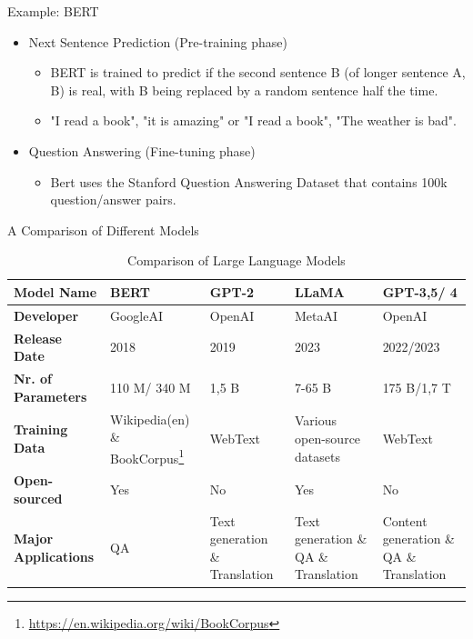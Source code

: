 \documentclass[t]{beamer}
\begin{document}
\begin{frame}{Example: BERT \cite{Devlin18}}
  \vspace{1cm}
  \begin{itemize}
    \item Next Sentence Prediction (Pre-training phase)
    \begin{itemize}
      \item BERT is trained to predict if the second sentence B (of longer sentence A, B) is real, with B being replaced by a random sentence half the time.
      \item "I read a book", "it is amazing" or "I read a book", "The weather is bad".
    \end{itemize}
    \vspace{1cm}
    \item Question Answering (Fine-tuning phase)
    \begin{itemize}
      \item Bert uses the Stanford Question Answering Dataset that contains 100k question/answer pairs.
    \end{itemize}
  \end{itemize}
\end{frame}

\begin{frame}{A Comparison of Different Models}
  \begin{table}[H]
    \centering
    \small
    \begin{tabular}{| p{4cm} | p{2cm} | p{2cm} | p{2cm} | p{2cm} |}
    \hline
    \textbf{Model Name} & BERT & GPT-2 & LLaMA & GPT-3,5/ 4 \\
    \hline
    \textbf{Developer} & GoogleAI & OpenAI & MetaAI & OpenAI \\
    \hline
    \textbf{Release Date} & 2018 & 2019 & 2023 & 2022/2023 \\
    \hline
    \textbf{Nr. of Parameters} & 110 M/ 340 M & 1,5 B & 7-65 B & 175 B/1,7 T \\
    \hline
    \textbf{Training Data} & Wikipedia(en) \& BookCorpus\footnote{\url{https://en.wikipedia.org/wiki/BookCorpus}} & WebText & Various open-source datasets & WebText \\
    \hline
    \textbf{Open-sourced} & Yes & No & Yes & No \\
    \hline
    \textbf{Major Applications} & QA & Text generation \& Translation & Text generation \& QA \& Translation & Content generation \& QA \& Translation \\
    \hline
    \end{tabular}
    \caption{Comparison of Large Language Models}
    \label{table:comparison}
  \end{table}
\end{frame}
\end{document}
